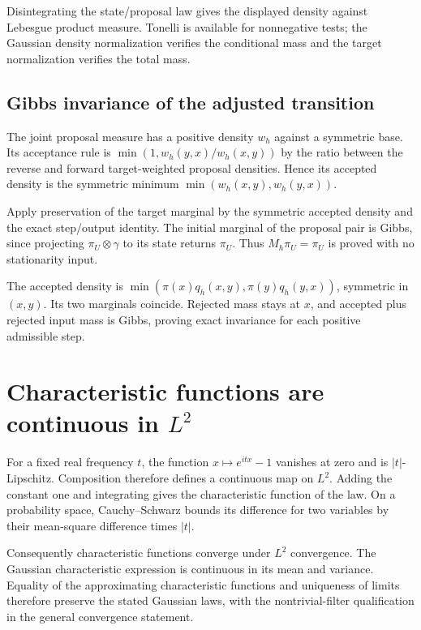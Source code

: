 \documentclass[11pt,a4paper]{article}
\begin{document}
Disintegrating the state/\allowbreak{}proposal law gives the displayed density against Lebesgue product measure. Tonelli is available for nonnegative tests; the Gaussian density normalization verifies the conditional mass and the target normalization verifies the total mass.


\subsection{\texorpdfstring{Gibbs invariance of the adjusted transition}{Gibbs invariance of the adjusted transition}}


The joint proposal measure has a positive density \(w_h\) against a symmetric base. Its acceptance rule is \(\min(1,w_h(y,x)/w_h(x,y))\) by the ratio between the reverse and forward target-weighted proposal densities. Hence its accepted density is the symmetric minimum \(\min(w_h(x,y),w_h(y,x))\).



Apply preservation of the target marginal by the symmetric accepted density and the exact step/\allowbreak{}output identity. The initial marginal of the proposal pair is Gibbs, since projecting \(\pi_U\otimes\gamma\) to its state returns \(\pi_U\). Thus \(M_h\pi_U=\pi_U\) is proved with no stationarity input.



The accepted density is \(\min(\pi(x)q_h(x,y),\pi(y)q_h(y,x))\), symmetric in \((x,y)\). Its two marginals coincide. Rejected mass stays at \(x\), and accepted plus rejected input mass is Gibbs, proving exact invariance for each positive admissible step.


\section{\texorpdfstring{Characteristic functions are continuous in \(L^2\)}{Characteristic functions are continuous in L²}}


For a fixed real frequency \(t\), the function \(x\mapsto e^{itx}-1\) vanishes at zero and is \(|t|\)-Lipschitz. Composition therefore defines a continuous map on \(L^2\). Adding the constant one and integrating gives the characteristic function of the law. On a probability space, Cauchy–Schwarz bounds its difference for two variables by their mean-square difference times \(|t|\).



Consequently characteristic functions converge under \(L^2\) convergence. The Gaussian characteristic expression is continuous in its mean and variance. Equality of the approximating characteristic functions and uniqueness of limits therefore preserve the stated Gaussian laws, with the nontrivial-filter qualification in the general convergence statement.
\end{document}
